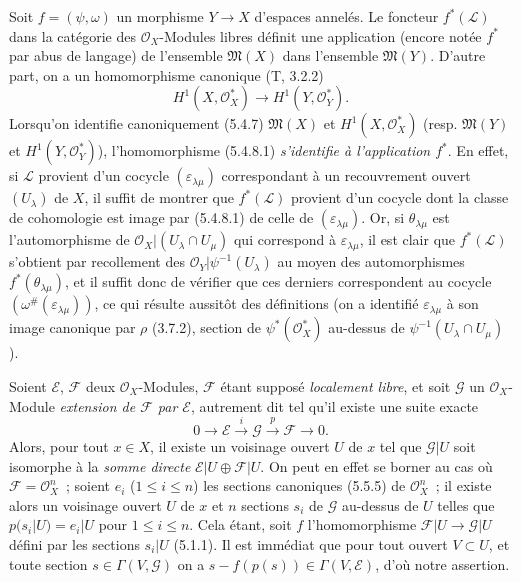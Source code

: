 \begin{env}[5.4.8]
\label{0.5.4.8-fr}
Soit $f=(\psi,\omega)$ un morphisme $Y\to X$ d'espaces annelés. Le foncteur
$f^*(\mathcal{L})$ dans la catégorie des $\mathcal{O}_X$-Modules libres
définit une application (encore notée $f^*$ par abus de langage) de l'ensemble
$\mathfrak{M}(X)$ dans l'ensemble $\mathfrak{M}(Y)$. D'autre part, on a un
homomorphisme canonique (T, 3.2.2)
\[
  H^1(X,\mathcal{O}_X^*)\longrightarrow H^1(Y,\mathcal{O}_Y^*).
  \tag{5.4.8.1}\label{0.5.4.8.1-fr}
\]
Lorsqu'on identifie canoniquement (5.4.7) $\mathfrak{M}(X)$ et
$H^1(X,\mathcal{O}_X^*)$ (resp. $\mathfrak{M}(Y)$ et
$H^1(Y,\mathcal{O}_Y^*)$), l'homomorphisme (5.4.8.1) \emph{s'identifie à
l'application $f^*$}. En effet, si $\mathcal{L}$ provient d'un cocycle
$(\varepsilon_{\lambda\mu})$ correspondant à un recouvrement ouvert
$(U_\lambda)$ de $X$, il suffit de montrer que $f^*(\mathcal{L})$ provient
d'un cocycle dont la classe de cohomologie est image par (5.4.8.1) de celle de
$(\varepsilon_{\lambda\mu})$. Or, si $\theta_{\lambda\mu}$ est
l'automorphisme de $\mathcal{O}_X|(U_\lambda\cap U_\mu)$ qui correspond à
$\varepsilon_{\lambda\mu}$, il est clair que $f^*(\mathcal{L})$ s'obtient par
recollement des $\mathcal{O}_Y|\psi^{-1}(U_\lambda)$ au moyen des
automorphismes $f^*(\theta_{\lambda\mu})$, et il suffit donc de vérifier que
ces derniers correspondent au cocycle
$(\omega^\#(\varepsilon_{\lambda\mu}))$, ce qui résulte aussitôt des
définitions (on a identifié $\varepsilon_{\lambda\mu}$ à son image canonique
par $\rho$ (3.7.2), section de $\psi^*(\mathcal{O}_X^*)$ au-dessus de
$\psi^{-1}(U_\lambda\cap U_\mu)$).
\end{env}

\begin{env}[5.4.9]
\label{0.5.4.9-fr}
Soient $\mathcal{E}$, $\mathcal{F}$ deux $\mathcal{O}_X$-Modules,
$\mathcal{F}$ étant supposé \emph{localement libre}, et soit $\mathcal{G}$ un
$\mathcal{O}_X$-Module \emph{extension de $\mathcal{F}$ par $\mathcal{E}$},
autrement dit tel qu'il existe une suite exacte
\[
  0\longrightarrow\mathcal{E}\xrightarrow{i}\mathcal{G}
  \xrightarrow{p}\mathcal{F}\longrightarrow 0.
\]
Alors, pour tout $x\in X$, il existe un voisinage ouvert $U$ de $x$ tel que
$\mathcal{G}|U$ soit isomorphe à la \emph{somme directe}
$\mathcal{E}|U\oplus\mathcal{F}|U$. On peut en effet se borner au cas où
$\mathcal{F}=\mathcal{O}_X^n$~; soient $e_i$ ($1\leq i\leq n$) les sections
canoniques (5.5.5) de $\mathcal{O}_X^n$~; il existe alors un voisinage ouvert
$U$ de $x$ et $n$ sections $s_i$ de $\mathcal{G}$ au-dessus de $U$ telles que
$p(s_i|U)=e_i|U$ pour $1\leq i\leq n$. Cela étant, soit $f$
l'homomorphisme $\mathcal{F}|U\to\mathcal{G}|U$ défini par les sections
$s_i|U$ (5.1.1). Il est immédiat que pour tout ouvert $V\subset U$, et toute
section $s\in\Gamma(V,\mathcal{G})$ on a
$s-f(p(s))\in\Gamma(V,\mathcal{E})$, d'où notre assertion.
\end{env}

